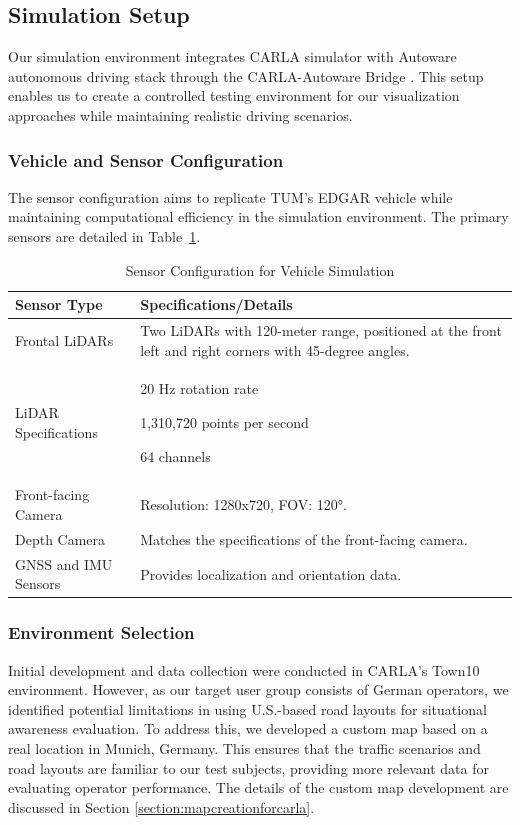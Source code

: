 \subsection{Simulation Setup}

Our simulation environment integrates CARLA simulator with Autoware autonomous driving stack through the CARLA-Autoware Bridge \cite{carla_aw_bridge24}. This setup enables us to create a controlled testing environment for our visualization approaches while maintaining realistic driving scenarios.


\subsubsection{Vehicle and Sensor Configuration}
The sensor configuration aims to replicate TUM's EDGAR vehicle while maintaining computational efficiency in the simulation environment. The primary sensors are detailed in Table~\ref{table:sensor_configuration}.

\begin{table}[h!]
\centering
\begin{tabular}{@{}p{4cm}p{10cm}@{}}
\toprule
\textbf{Sensor Type} & \textbf{Specifications/Details} \\
\midrule
Frontal \ac{LiDAR}s & Two \ac{LiDAR}s with 120-meter range, positioned at the front left and right corners with 45-degree angles. \\
\midrule
\ac{LiDAR} Specifications &
20 Hz rotation rate \par
1,310,720 points per second \par
64 channels \\
\midrule
Front-facing Camera & Resolution: 1280x720, \ac{FOV}: 120°. \\
\midrule
Depth Camera & Matches the specifications of the front-facing camera. \\
\midrule
GNSS and IMU Sensors & Provides localization and orientation data. \\
\bottomrule
\end{tabular}
\caption{Sensor Configuration for Vehicle Simulation}
\label{table:sensor_configuration}
\end{table}

\subsubsection{Environment Selection}
Initial development and data collection were conducted in CARLA's Town10 environment. However, as our target user group consists of German operators, we identified potential limitations in using U.S.-based road layouts for situational awareness evaluation. To address this, we developed a custom map based on a real location in Munich, Germany. This ensures that the traffic scenarios and road layouts are familiar to our test subjects, providing more relevant data for evaluating operator performance. The details of the custom map development are discussed in Section \ref{section:mapcreationforcarla}.
